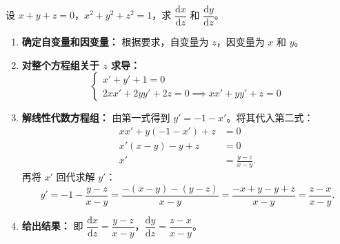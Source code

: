 \documentclass[lang=cn,11pt]{elegantbook}
\begin{document}
\begin{exercise}[方程组隐函数求导]
设 $x + y + z = 0$，$x^2 + y^2 + z^2 = 1$，求 $\dfrac{\mathrm{d}x}{\mathrm{d}z}$ 和 $\dfrac{\mathrm{d}y}{\mathrm{d}z}$。
\end{exercise}
\begin{solution}
\begin{enumerate}
  \item \textbf{确定自变量和因变量：}
  根据要求，自变量为 $z$，因变量为 $x$ 和 $y$。
  
  \item \textbf{对整个方程组关于 $z$ 求导：}
  \[
  \begin{cases}
  x' + y' + 1 = 0 \\
  2xx' + 2yy' + 2z = 0 \implies xx' + yy' + z = 0
  \end{cases}
  \]
  
  \item \textbf{解线性代数方程组：}
  由第一式得到 $y' = -1 - x'$。将其代入第二式：
  \begin{align*}
  xx' + y(-1 - x') + z &= 0 \\
  x'(x-y) - y + z &= 0 \\
  x' &= \frac{y-z}{x-y}.
  \end{align*}
  再将 $x'$ 回代求解 $y'$：
  \[
  y' = -1 - \frac{y-z}{x-y} = \frac{-(x-y) - (y-z)}{x-y} = \frac{-x+y-y+z}{x-y} = \frac{z-x}{x-y}.
  \]
  
  \item \textbf{给出结果：}
  即 $\dfrac{\mathrm{d}x}{\mathrm{d}z} = \dfrac{y-z}{x-y}$，$\dfrac{\mathrm{d}y}{\mathrm{d}z} = \dfrac{z-x}{x-y}$。
\end{enumerate}
\end{solution}
\end{document}
